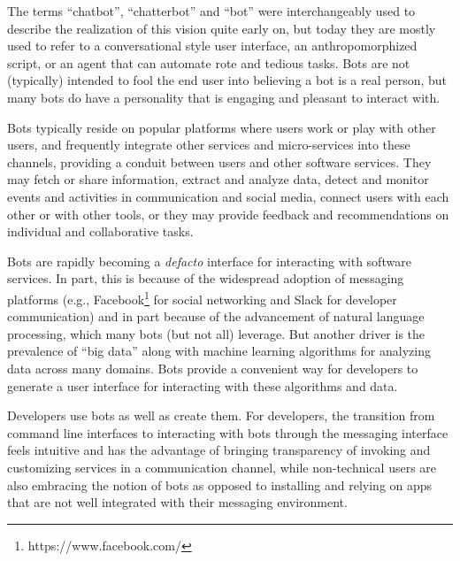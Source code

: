 \documentclass{sig-alternate}
\begin{document}
The terms ``chatbot'', ``chatterbot'' and ``bot'' were interchangeably used to describe the realization of this vision quite early on, but today they are mostly used to refer to a conversational style user interface, an anthropomorphized script, or an agent that can automate rote and tedious tasks.
Bots are not (typically) intended to fool the end user into believing a bot is a real person, but many bots do have a personality that is engaging and pleasant to interact with. 
 
Bots typically reside on popular platforms where users work or play with other users, and frequently integrate other services and micro-services into these channels, providing a conduit between users and other software services. 
They may fetch or share information, extract and analyze data, detect and monitor events and activities in communication and social media, connect users with each other or with other tools, or they may provide feedback and recommendations on individual and collaborative tasks. 

Bots are rapidly becoming a \emph{defacto} interface for interacting with software services.  In part, this is because of the widespread adoption of messaging platforms (e.g., Facebook\footnote{https://www.facebook.com/\label{Facebook}} for social networking and Slack for developer communication) and in part because of the advancement of natural language processing, which many bots (but not all) leverage.
But another driver is the prevalence of ``big data'' along with machine learning algorithms for analyzing data across many domains.  Bots provide a convenient way for developers to generate a user interface for interacting with these algorithms and data. 

Developers use bots as well as create them. For developers, the transition from command line interfaces to interacting with bots through the messaging interface feels intuitive and has the advantage of bringing transparency of invoking and customizing services in a communication channel, while non-technical users are also embracing the notion of bots as opposed to installing and relying on apps that are not well integrated with their messaging environment.  
\end{document}
